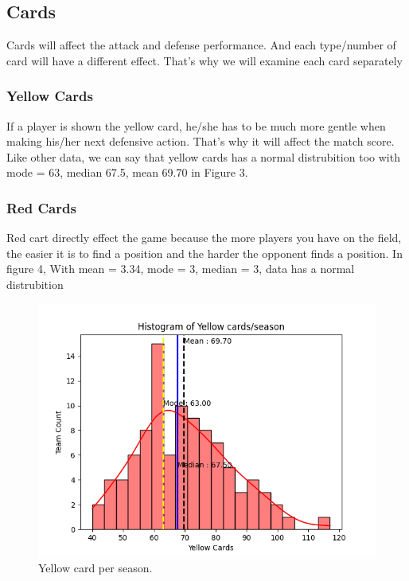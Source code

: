 \documentclass[conference]{IEEEtran}
\begin{document}
\subsection{Cards}
Cards will affect the attack and defense performance. And each type/number of card will have a different effect. That's why we will examine each card separately
\subsubsection{Yellow Cards}
If a player is shown the yellow card, he/she has to be much more gentle when making his/her next defensive action. That's why it will affect the match score.
Like other data, we can say that yellow cards has a normal distrubition too with mode = 63, median 67.5, mean 69.70 in Figure 3.

\subsubsection{Red Cards}
Red cart directly effect the game because the more players you have on the field, the easier it is to find a position and the harder the opponent finds a position.  In figure 4, With mean = 3.34, mode = 3, median = 3, data has a normal distrubition 


\begin{figure}[h]
  \includegraphics[width=\linewidth]{YellowCardFigure.png}
  \caption{Yellow card per season.}
  \label{fig:yc}
\end{figure}
\end{document}
